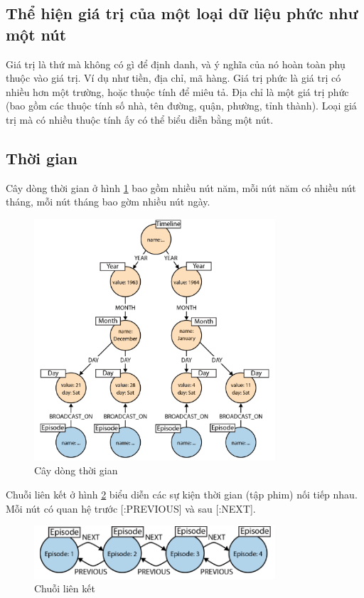 \subsection{Thể hiện giá trị của một loại dữ liệu phức như một nút}
Giá trị là thứ mà không có gì để định danh, và ý nghĩa của nó hoàn toàn phụ thuộc vào giá trị. Ví dụ như tiền, địa chỉ, mã hàng. Giá trị phức là giá trị có nhiều hơn một trường, hoặc thuộc tính để miêu tả. Địa chỉ là một giá trị phức (bao gồm các thuộc tính số nhà, tên đường, quận, phường, tỉnh thành). Loại giá trị mà có nhiều thuộc tính ấy có thể biểu diễn bằng một nút. 

\subsection{Thời gian}

Cây dòng thời gian ở hình \ref{fig:timeline} bao gồm nhiều nút năm, mỗi nút năm có nhiều nút tháng, mỗi nút tháng bao gờm nhiều nút ngày. 

\begin{figure}[h]
\centering
\includegraphics[width=0.8\textwidth]{image/timeline.PNG}
\caption{\label{fig:timeline} Cây dòng thời gian }
\end{figure}

Chuỗi liên kết ở hình \ref{fig:link} biểu diễn các sự kiện thời gian (tập phim) nối tiếp nhau. Mỗi nút có quan hệ trước [:PREVIOUS] và sau [:NEXT]. 

\begin{figure}[h]
\centering
\includegraphics[width=0.8\textwidth]{image/link.PNG}
\caption{\label{fig:link} Chuỗi liên kết }
\end{figure}

